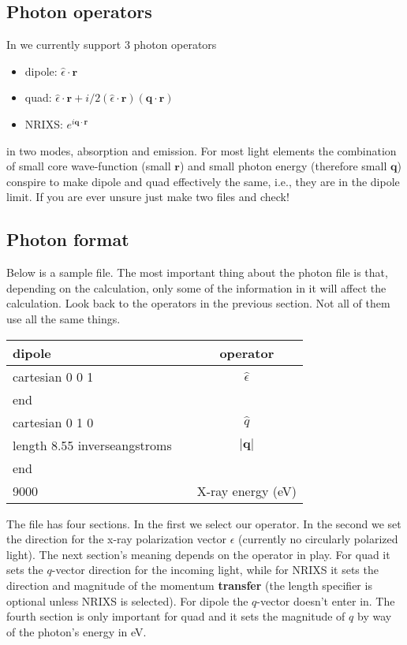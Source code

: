 \documentclass[11pt]{report}
\begin{document}
\subsection{Photon operators}
In \OCEAN{} we currently support 3 photon operators
\begin{itemize}
\item dipole: $\hat{\epsilon} \cdot \mathbf{r}$
\item quad: $\hat{\epsilon} \cdot \mathbf{r} + i/2 \left( \hat{\epsilon} \cdot \mathbf{r} \right) \left(\mathbf{q} \cdot \mathbf{r} \right)$
\item NRIXS: $e^{i \mathbf{q} \cdot \mathbf{r} }$
\end{itemize}
in two modes, absorption and emission. For most light elements the combination of small core wave-function (small $\mathbf{r}$) and small photon energy (therefore small $\mathbf{q}$) conspire to make dipole and quad effectively the same, i.e., they are in the dipole limit. If you are ever unsure just make two  files and check!

\subsection{Photon format}
Below is a sample  file. The most important thing about the photon file is that, depending on the calculation, only some of the information in it will affect the calculation. Look back to the operators in the previous section. Not all of them use all the same things. 

\begin{center}
\begin{tabular}{| l | c c|}
\hline
dipole				& & operator \\
\hline
cartesian  0  0  1		& & $\hat{\epsilon}$  \\
end			& & \\
\hline
cartesian  0  1  0		& & $\hat{q}$  \\
length 8.55 inverseangstroms && $\vert \mathbf{q} \vert$ \\
end			& & \\
\hline
9000 & & X-ray energy (eV) \\
\hline
\end{tabular}
\end{center}

The file has four sections. In the first we select our operator. In the second we set the direction for the x-ray polarization vector $\epsilon$ (currently no circularly polarized light). The next section's meaning depends on the operator in play. For quad it sets the $q$-vector direction for the incoming light, while for NRIXS it sets the direction and magnitude of the momentum \textbf{transfer} (the length specifier is optional unless NRIXS is selected). For dipole the $q$-vector doesn't enter in. The fourth section is only important for quad and it sets the magnitude of $q$ by way of the photon's energy in eV. 
\end{document}
